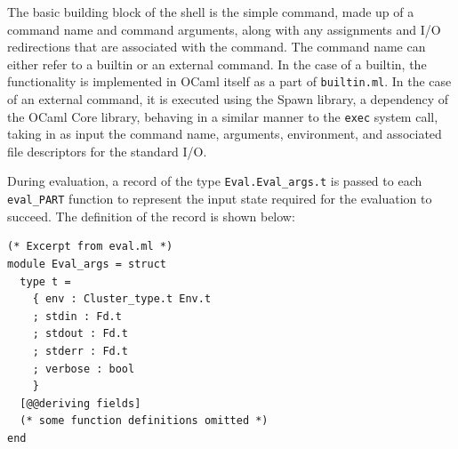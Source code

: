 \documentclass[twoside]{report}
\begin{document}



The basic building block of the shell is the simple command, made up of a command name and command arguments, along with any assignments and I/O redirections that are associated with the command.
The command name can either refer to a builtin or an external command.
In the case of a builtin, the functionality is implemented in OCaml itself as a part of \texttt{builtin.ml}.
In the case of an external command, it is executed using the Spawn library, a dependency of the OCaml Core library, behaving in a similar manner to the \texttt{exec} system call, taking in as input the command name, arguments, environment, and associated file descriptors for the standard I/O.

During evaluation, a record of the type \texttt{Eval.Eval\_args.t} is passed to each \texttt{eval\_PART} function to represent the input state required for the evaluation to succeed. The definition of the record is shown below:

\begin{minipage}[c]{\textwidth-15pt}
  \begin{lstlisting}
(* Excerpt from eval.ml *)
module Eval_args = struct
  type t =
    { env : Cluster_type.t Env.t
    ; stdin : Fd.t
    ; stdout : Fd.t
    ; stderr : Fd.t
    ; verbose : bool
    }
  [@@deriving fields]
  (* some function definitions omitted *)
end
\end{lstlisting}
  \smallskip
\end{minipage}
\end{document}
